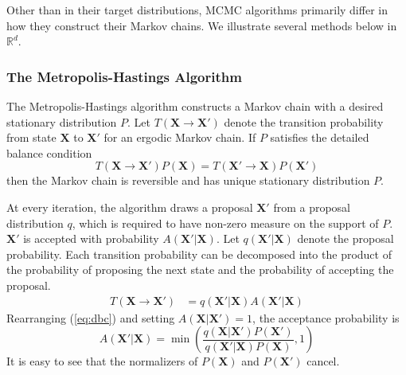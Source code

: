 \documentclass[a4paper,11pt]{article}
\begin{document}
Other than in their target distributions, MCMC algorithms primarily differ in how they construct their Markov chains. We illustrate several methods below in $\mathbb{R}^{d}$.

\subsubsection{The Metropolis-Hastings Algorithm}
The Metropolis-Hastings algorithm \cite{metropolis_equation_1953,hastings_monte_1970} constructs a Markov chain with a desired stationary distribution $P$. Let $T(\mathbf{X} \rightarrow \mathbf{X}')$ denote the transition probability from state $\mathbf{X}$ to $\mathbf{X'}$ for an ergodic Markov chain. If $P$ satisfies the detailed balance condition
\begin{equation}
   T(\mathbf{X} \rightarrow \mathbf{X}') P(\mathbf{X}) = T(\mathbf{X}' \rightarrow \mathbf{X}) P(\mathbf{X}')
   \label{eq:dbc}
\end{equation}
then the Markov chain is reversible and has unique stationary distribution $P$. 

At every iteration, the algorithm draws a proposal $\mathbf{X}'$ from a proposal distribution $q$, which is required to have non-zero measure on the support of $P$. $\mathbf{X}'$ is accepted with probability $A(\mathbf{X}'|\mathbf{X})$. Let $q(\mathbf{X}'|\mathbf{X})$ denote the proposal probability. Each transition probability can be decomposed into the product of the probability of proposing the next state and the probability of accepting the proposal.
\begin{align*}
    T(\mathbf{X} \rightarrow \mathbf{X}') &= q(\mathbf{X}'|\mathbf{X}) A(\mathbf{X}'|\mathbf{X})
\end{align*}
Rearranging (\ref{eq:dbc}) and setting  $A(\mathbf{X}|\mathbf{X}')=1$, the acceptance probability is
\begin{equation}
    A(\mathbf{X}'|\mathbf{X}) = \min{\left(\frac{q(\mathbf{X}|\mathbf{X}')  P(\mathbf{X}') }{q(\mathbf{X}'|\mathbf{X})  P(\mathbf{X})}, 1\right)}
    \label{eq:mh_acceptance}
\end{equation}
It is easy to see that the normalizers of $P(\mathbf{X})$ and $P(\mathbf{X}')$ cancel.
\end{document}
